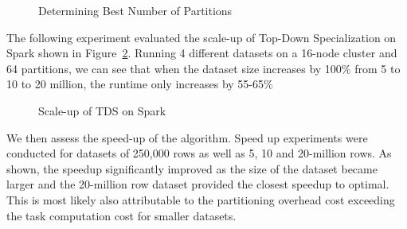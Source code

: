 \documentclass[11pt]{article}       %
\begin{document}
\begin{figure}[htp]
\centering
{}
\caption{Determining Best Number of Partitions}
\label{bestPartition}
\end{figure}

The following experiment evaluated the scale-up of Top-Down Specialization on Spark shown in Figure~\ref{scaleUp}. Running 4 different datasets on a 16-node cluster and 64 partitions, we can see that when the dataset size increases by 100\% from 5 to 10 to 20 million, the runtime only increases by 55-65\%

\begin{figure}[h]
\centering
{}
\caption{Scale-up of TDS on Spark}
\label{scaleUp}
\end{figure}

We then assess the speed-up of the algorithm. Speed up experiments were conducted for datasets of 250,000 rows as well as 5, 10 and 20-million rows. As shown, the speedup significantly improved as the size of the dataset became larger and the 20-million row dataset provided the closest speedup to optimal. This is most likely also attributable to the partitioning overhead cost exceeding the task computation cost for smaller datasets. 
\end{document}
